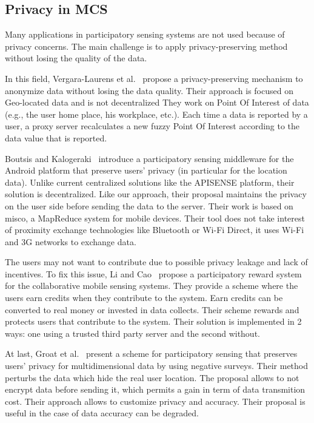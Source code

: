 \subsection{Privacy in MCS}

Many applications in participatory sensing systems are not used because of privacy concerns. 
The main challenge is to apply privacy-preserving method without losing the quality of the data.

In this field, Vergara-Laurens et al.~\cite{DBLP:conf/percom/Vergara-LaurensML14} propose a privacy-preserving mechanism to anonymize data without losing the data quality.
Their approach is focused on Geo-located data and is not decentralized
They work on Point Of Interest of data (e.g., the user home place, his workplace, etc.).
Each time a data is reported by a user, a proxy server recalculates a new fuzzy Point Of Interest according to the data value that is reported.

Boutsis and Kalogeraki~\cite{DBLP:conf/percom/BoutsisK13} introduce a participatory sensing middleware for the Android platform that preserve users' privacy (in particular for the location data).
Unlike current centralized solutions like the APISENSE platform, their solution is decentralized.
Like our approach, their proposal maintains the privacy on the user side before sending the data to the server.
Their work is based on misco, a MapReduce system for mobile devices.
Their tool does not take interest of proximity exchange technologies like Bluetooth or Wi-Fi Direct, it uses Wi-Fi and 3G networks to exchange data.

The users may not want to contribute due to possible privacy leakage and lack of incentives.
To fix this issue, Li and Cao~\cite{DBLP:conf/percom/LiC13} propose a participatory reward system for the collaborative mobile sensing systems.
They provide a scheme where the users earn credits when they contribute to the system.
Earn credits can be converted to real money or invested in data collects.
Their scheme rewards and protects users that contribute to the system.
Their solution is implemented in 2 ways: one using a trusted third party server and the second without.

At last, Groat et al.~\cite{DBLP:conf/percom/GroatEHHF12} present a scheme for participatory sensing that preserves users' privacy for multidimensional data by using negative surveys.
Their method perturbs the data which hide the real user location.
The proposal allows to not encrypt data before sending it, which permits a gain in term of data transmition cost.
Their approach allows to customize privacy and accuracy.
Their proposal is useful in the case of data accuracy can be degraded.


